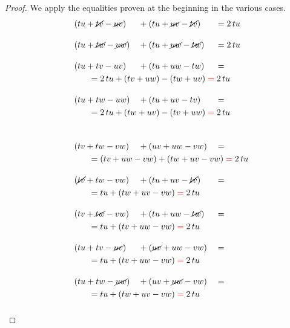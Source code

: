 \documentclass[./main.tex]{subfiles}
\begin{document}
\begin{proof}
    We apply the equalities proven at the beginning in the various cases.
    \begin{alignat*}{3}
        &(tu + \cancel{tv} - \cancel{uv}) &{}+{}& (tu + \cancel{uv} - \cancel{tv}) &{}={}& 2\,tu \\[10pt]
        &(tu + \cancel{tw} - \cancel{uw}) &{}+{}& (tu + \cancel{uw} - \cancel{tw}) &{}={}& 2\,tu \\[10pt]
        &(tu + tv - uv) &{}+{}& (tu + uw - tw) &{}={}& \\
        &\mathrlap{\qquad = 2\,tu + (tv + uw) - (tw + uv) \mathcolor{red}{=} 2\,tu } \\[10pt]
        &(tu + tw - uw) &{}+{}& (tu + uv - tv) &{}={}& \\
        &\mathrlap{\qquad = 2\,tu + (tw + uv) - (tv + uw) \mathcolor{red}{=} 2\,tu } \\[10pt]
        \\
        &(tv + tw - vw) &{}+{}& (uv + uw - vw) &{}={}& \\
        &\mathrlap{\qquad = (tv + uw - vw) + (tw + uv - vw) \mathcolor{red}{=} 2\,tu } \\[10pt]
        &(\cancel{tv} + tw - vw) &{}+{}& (tu + uv - \cancel{tv}) &{}={}& \\
        &\mathrlap{\qquad = tu + (tw + uv - vw) \mathcolor{red}{=} 2\,tu } \\[10pt]
        &(tv + \cancel{tw} - vw) &{}+{}& (tu + uw - \cancel{tw}) &{}={}& \\
        &\mathrlap{\qquad = tu + (tv + uw - vw) \mathcolor{red}{=} 2\,tu } \\[10pt]
        &(tu + tv - \cancel{uv}) &{}+{}& (\cancel{uv} + uw - vw) &{}={}& \\
        &\mathrlap{\qquad = tu + (tv + uw - vw) \mathcolor{red}{=} 2\,tu } \\[10pt]
        &(tu + tw - \cancel{uw}) &{}+{}& (uv + \cancel{uw} - vw) &{}={}& \\
        &\mathrlap{\qquad = tu + (tw + uv - vw) \mathcolor{red}{=} 2\,tu } \\[10pt]
    \end{alignat*}
    
\end{proof}
\end{document}
